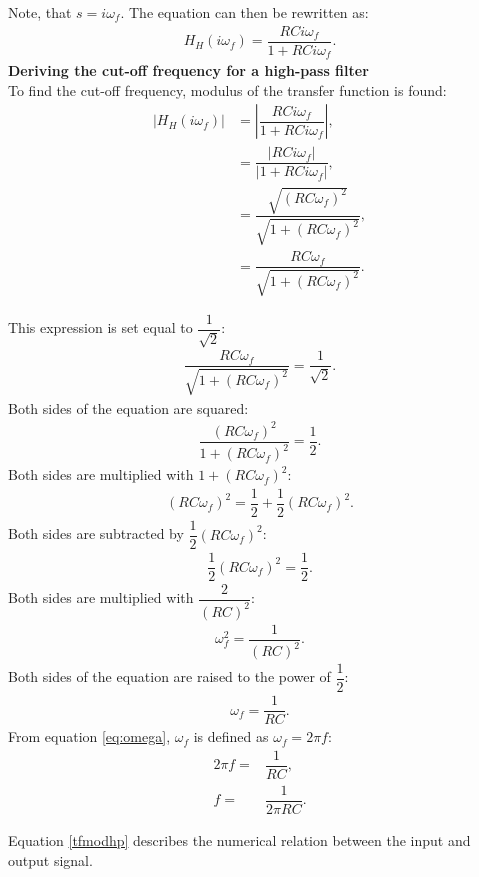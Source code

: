 Note, that $s=i\omega_f$. The equation can then be rewritten as:
\begin{align*}
H_{H}(i \omega_f) = \dfrac{RCi \omega_f}{1 + RCi \omega_f}.
\end{align*}
\textbf{Deriving the cut-off frequency for a high-pass filter} \\
To find the cut-off frequency, modulus of the transfer function is found:
\begin{align}
\left|H_{H}(i \omega_f)\right| &= \left|\dfrac{RCi \omega_f}{1 + RCi \omega_f} \right|, \nonumber \\
 &= \dfrac{|RCi \omega_f|}{|1 + RCi \omega_f |}, \nonumber \\
 &= \dfrac{\sqrt{(RC \omega_f)^2}}{\sqrt{1 + (RC \omega_f)^2 }}, \nonumber \\
 &= \dfrac{RC \omega_f}{\sqrt{1 + (RC \omega_f)^2 }}. \label{tfmodhp}
\end{align} 

This expression is set equal to $\dfrac{1}{\sqrt{2}}$:
\begin{align*}
\dfrac{RC \omega_f}{\sqrt{1 + (RC \omega_f)^2 }}=\dfrac{1}{\sqrt{2}}.
\end{align*}
Both sides of the equation are squared:
\begin{align*}
\dfrac{(RC \omega_f)^2}{1 + (RC \omega_f)^2 }=\dfrac{1}{2}.
\end{align*}
Both sides are multiplied with $1+(RC\omega_f)^2$:
\begin{align*}
(RC \omega_f)^2 =\dfrac{1}{2}+\dfrac{1}{2}(RC\omega_f)^2.
\end{align*}
Both sides are subtracted  by $\dfrac{1}{2}(RC\omega_f)^2$:
\begin{align*}
\dfrac{1}{2}(RC \omega_f)^2 =\dfrac{1}{2}.
\end{align*}
Both sides are multiplied with $\dfrac{2}{(RC)^2}$:
\begin{align*}
\omega_f^2 =\dfrac{1}{(RC)^2}.
\end{align*}
Both sides of the equation are raised to the power of $\dfrac{1}{2}$:
\begin{align*}
\omega_f =\dfrac{1}{RC}.
\end{align*}
From equation \eqref{eq:omega}, $\omega_f$ is defined as $\omega_f=2 \pi f$:
\begin{align*}
2\pi f=&\dfrac{1}{RC},
\\
f=&\dfrac{1}{2\pi RC}.
\end{align*}

\noindent Equation \eqref{tfmodhp} describes the numerical relation between the input and output signal.


